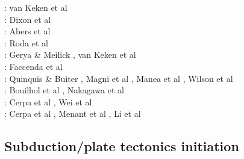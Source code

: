 \begin{scriptsize}
\twothousandtwo: van Keken et al \cite{vakp02}\\
\twothousandfour: Dixon et al \cite{didb04}\\
\twothousandsix: Abers et al \cite{abvk06}\\
\twothousandten: Roda et al \cite{roms10}\\
\twothousandeleven: Gerya \& Meilick \cite{geme11}, van Keken et al \cite{vahs11}\\
\twothousandtwelve: Faccenda et al \cite{fagm12}\\
\twothousandfourteen: Quinquis \& Buiter \cite{qubu14}, Magni et al \cite{mabv14}, Manea et al \cite{malg14}, 
Wilson et al \cite{wisv14}\\
\twothousandfifteen: Bouilhol et al \cite{bomv15}, Nakagawa et al \cite{nani15}\\
\twothousandseventeen: Cerpa et al \cite{ceww17}, Wei et al \cite{wewv17}\\
\twothousandnineteen: Cerpa et al \cite{ceww19}, Menant et al \cite{meag19}, Li et al \cite{ligc19}
\end{scriptsize}


\subsection{Subduction/plate tectonics initiation}

